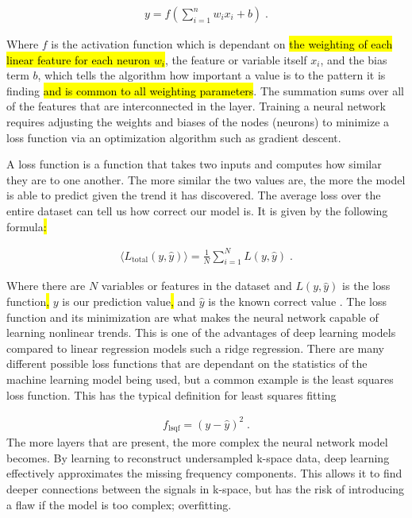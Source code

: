 \documentclass[14pt]{extreport}
\begin{document}
        \begin{align}
           y = f\left(\sum_{i = 1}^n w_i x_i + b \right) \;.
        \end{align}

        Where $f$ is the activation function which is dependant on \hl{the weighting of each linear feature for each neuron $w_i$}, the feature or variable itself $x_i$, and the bias term $b$, which tells the algorithm how important a value is to the pattern it is finding \hl{and is common to all weighting parameters}. The summation sums over all of the features that are interconnected in the layer. Training a neural network requires adjusting the weights and biases of the nodes (neurons) to minimize a loss function via an optimization algorithm such as gradient descent. 
        
        A loss function is a function that takes two inputs and computes how similar they are to one another. The more similar the two values are, the more the model is able to predict given the trend it has discovered. The average loss over the entire dataset can tell us how correct our model is. It is given by the following formula\hl{:}
        
        \begin{align}
            \langle L_{\text{total}}(y, \hat{y}) \rangle = \frac{1}{N} \sum_{i = 1}^N L(y, \hat{y})\;.
        \end{align}

        Where there are $N$ variables or features in the dataset and $L(y, \hat{y})$ is the loss function\hl{,} $y$ is our prediction value\hl{,} and $\hat{y}$ is the known correct value \cite{Hoyle_2024}. The loss function and its minimization are what makes the neural network capable of learning nonlinear trends. This is one of the advantages of deep learning models compared to linear regression models such a ridge regression. There are many different possible loss functions that are dependant on the statistics of the machine learning model being used, but a common example is the least squares loss function. This has the typical definition for least squares fitting \cite{Hoyle_2024}
        
        \begin{align}
            f_{\text{lsqf}} = \left(y - \hat{y} \right)^2\;.
        \end{align}
        The more layers that are present, the more complex the neural network model becomes. By learning to reconstruct undersampled k-space data, deep learning effectively approximates the missing frequency components. This allows it to find deeper connections between the signals in k-space, but has the risk of introducing a flaw if the model is too complex; overfitting. 
\end{document}
